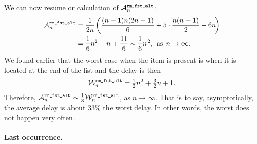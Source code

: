 We can now resume or calculation of \(\ave{rm\_fst\_alt}{n}\):
\begin{align*}
\ave{rm\_fst\_alt}{n}
  &= \frac{1}{2n}\left(\frac{(n-1)n(2n-1)}{6} + 5 \cdot
     \frac{n(n-1)}{2} + 6n\!\right)\\
  &= \frac{1}{6}{n^2} + n + \frac{11}{6} \mathrel{\sim}
     \frac{1}{6}n^2,\,\; \text{as} \,\; n \rightarrow \infty.
\end{align*}
We found earlier that the worst case when the item is present is when
it is located at the end of the list and the delay is then
\[
\worst{rm\_fst\_alt}{n} = \tfrac{1}{2}{n^2} + \tfrac{3}{2}{n} + 1.
\]
Therefore, \(\ave{rm\_fst\_alt}{n} \mathrel{\sim} \tfrac{1}{3}
\worst{rm\_fst\_alt}{n}\), as \(n \rightarrow \infty\). That is to
say, asymptotically, the average delay is about 33\% the worst
delay. In other words, the worst does not happen very often.

\medskip

\paragraph{Last occurrence.}

